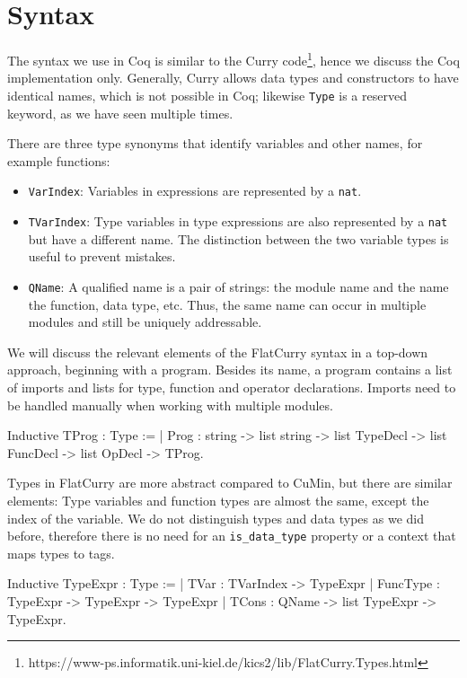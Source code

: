 \documentclass[fleqn]{scrreprt}
\newcommand{\todo}[1]{\marginpar{\textbf{TODO:} #1}}
\newcommand{\coqinline}[1]{\texttt{#1}}
\begin{document}
\section{Syntax}
The syntax we use in Coq is similar to the Curry code\footnote{https://www-ps.informatik.uni-kiel.de/kics2/lib/FlatCurry.Types.html}, hence we discuss the Coq implementation only. Generally, Curry allows data types and constructors to have identical names, which is not possible in Coq; likewise \texttt{Type} is a reserved keyword, as we have seen multiple times.
\par
There are three type synonyms that identify variables and other names, for example functions:
\begin{itemize}
	\item \coqinline{VarIndex}: Variables in expressions are represented by a \coqinline{nat}.
	\item \coqinline{TVarIndex}: Type variables in type expressions are also represented by a \coqinline{nat} but have a different name. The distinction between the two variable types is useful to prevent mistakes.
	\item \coqinline{QName}: A qualified name is a pair of strings: the module name and the name the function, data type, etc. Thus, the same name can occur in multiple modules and still be uniquely addressable.
\end{itemize}
We will discuss the relevant elements of the FlatCurry syntax in a top-down approach, beginning with a program. Besides its name, a program contains a list of imports and lists for type, function and operator declarations. Imports need to be handled manually when working with multiple modules. \todo{Verlinkung praktische Nutzung}
\begin{coqcode}
Inductive TProg : Type := 
| Prog : string -> list string ->
         list TypeDecl -> list FuncDecl -> list OpDecl -> TProg.
\end{coqcode}
Types in FlatCurry are more abstract compared to CuMin, but there are similar elements: Type variables and function types are almost the same, except the index of the variable. We do not distinguish types and data types as we did before, therefore there is no need for an \texttt{is\_data\_type} property or a context that maps types to tags.
\begin{coqcode}
Inductive TypeExpr : Type :=
  | TVar     : TVarIndex -> TypeExpr
  | FuncType : TypeExpr  -> TypeExpr      -> TypeExpr
  | TCons    : QName     -> list TypeExpr -> TypeExpr.
\end{coqcode}
\end{document}
